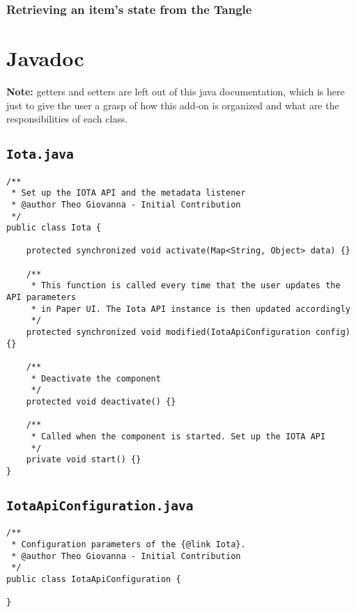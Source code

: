 \documentclass[a4paper,10pt]{article}
\begin{document}
\subsubsection{Retrieving an item's state from the Tangle}   

\newpage 

\section{Javadoc}

\textbf{Note:} getters and setters are left out of this java documentation, which is here just to give the user a grasp of how this add-on is organized and what are the responsibilities of each class.

\subsection{\texttt{Iota.java}}

\begin{verbatim}
/**
 * Set up the IOTA API and the metadata listener
 * @author Theo Giovanna - Initial Contribution
 */
public class Iota {
	
    protected synchronized void activate(Map<String, Object> data) {}
    
    /**
     * This function is called every time that the user updates the API parameters
     * in Paper UI. The Iota API instance is then updated accordingly
     */
    protected synchronized void modified(IotaApiConfiguration config) {}
    
    /**
     * Deactivate the component
     */
    protected void deactivate() {}
    
    /**
     * Called when the component is started. Set up the IOTA API
     */
    private void start() {}
}
\end{verbatim}


\subsection{\texttt{IotaApiConfiguration.java}}

\begin{verbatim}
/**
 * Configuration parameters of the {@link Iota}.
 * @author Theo Giovanna - Initial Contribution
 */
public class IotaApiConfiguration {

}
\end{verbatim}
\end{document}
